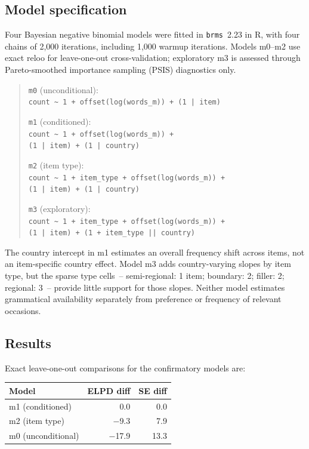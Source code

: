 \documentclass[12pt]{article}
\begin{document}
\subsection{Model specification}

Four Bayesian negative binomial models were fitted in \texttt{brms}~2.23 in R, with four chains of 2,000 iterations, including 1,000 warmup iterations. Models m0--m2 use exact reloo for leave-one-out cross-validation; exploratory m3 is assessed through Pareto-smoothed importance sampling (PSIS) diagnostics only.

\begin{quote}
\small \noindent\texttt{m0} (unconditional):\\ \texttt{count \textasciitilde{} 1 + offset(log(words\_m)) + (1~|~item)}

\noindent\parbox{\linewidth}{\texttt{m1} (conditioned):\\ \texttt{count \textasciitilde{} 1 + offset(log(words\_m)) +}\\ \texttt{(1~|~item) + (1~|~country)}}

\noindent\parbox{\linewidth}{\texttt{m2} (item type):\\ \texttt{count \textasciitilde{} 1 + item\_type + offset(log(words\_m)) +}\\ \texttt{(1~|~item) + (1~|~country)}}

\noindent\parbox{\linewidth}{\texttt{m3} (exploratory):\\ \texttt{count \textasciitilde{} 1 + item\_type + offset(log(words\_m)) +}\\ \texttt{(1~|~item) + (1~+~item\_type~||~country)}}
\end{quote}

The country intercept in m1 estimates an overall frequency shift across items, not an item-specific country effect. Model m3 adds country-varying slopes by item type, but the sparse type cells~-- semi-regional: 1 item; boundary: 2; filler: 2; regional: 3~-- provide little support for those slopes. Neither model estimates grammatical availability separately from preference or frequency of relevant occasions.

\subsection{Results}

Exact leave-one-out comparisons for the confirmatory models are:

\begin{center}
\begin{tabular}{lrr}
  \hline
  Model & ELPD diff & SE diff \\
  \hline
  m1 (conditioned) & 0.0 & 0.0 \\
  m2 (item type) & $-$9.3 & 7.9 \\
  m0 (unconditional) & $-$17.9 & 13.3 \\
  \hline
\end{tabular}
\end{center}
\end{document}
